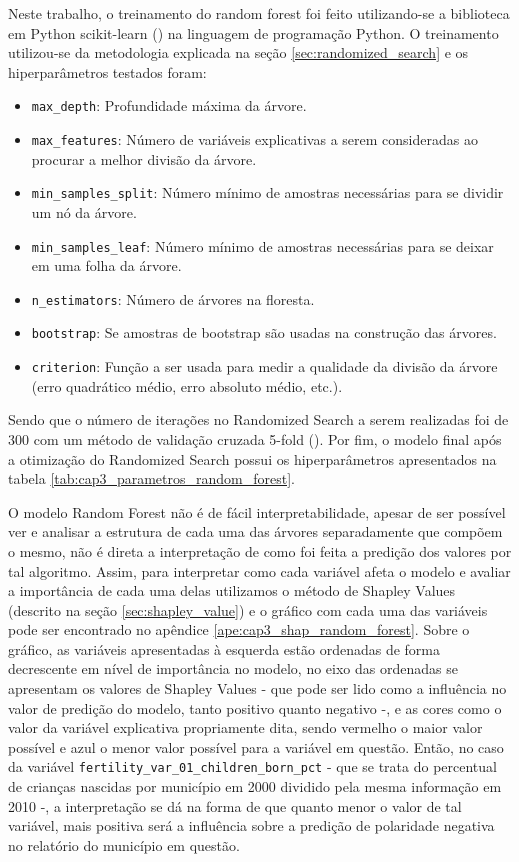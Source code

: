Neste trabalho, o treinamento do random forest foi feito utilizando-se a biblioteca em Python scikit-learn (\citet{Sklearn}) na linguagem de programação Python. O treinamento utilizou-se da metodologia explicada na seção \ref{sec:randomized_search} e os hiperparâmetros testados foram:

\begin{itemize}
	\item \verb|max_depth|: Profundidade máxima da árvore.
	\item \verb|max_features|: Número de variáveis explicativas a serem consideradas ao procurar a melhor divisão da árvore.
	\item \verb|min_samples_split|: Número mínimo de amostras necessárias para se dividir um nó da árvore.
	\item \verb|min_samples_leaf|: Número mínimo de amostras necessárias para se deixar em uma folha da árvore.
	\item \verb|n_estimators|: Número de árvores na floresta.
	\item \verb|bootstrap|: Se amostras de bootstrap são usadas na construção das árvores.
	\item \verb|criterion|: Função a ser usada para medir a qualidade da divisão da árvore (erro quadrático médio, erro absoluto médio, etc.).
\end{itemize}

Sendo que o número de iterações no Randomized Search a serem realizadas foi de 300 com um método de validação cruzada 5-fold (\citet{Kohavi1995}). Por fim, o modelo final após a otimização do Randomized Search possui os hiperparâmetros apresentados na tabela \ref{tab:cap3_parametros_random_forest}.

O modelo Random Forest não é de fácil interpretabilidade, apesar de ser possível ver e analisar a estrutura de cada uma das árvores separadamente que compõem o mesmo, não é direta a interpretação de como foi feita a predição dos valores por tal algoritmo. Assim, para interpretar como cada variável afeta o modelo e avaliar a importância de cada uma delas utilizamos o método de Shapley Values (descrito na seção \ref{sec:shapley_value}) e o gráfico com cada uma das variáveis pode ser encontrado no apêndice \ref{ape:cap3_shap_random_forest}. Sobre o gráfico, as variáveis apresentadas à esquerda estão ordenadas de forma decrescente em nível de importância no modelo, no eixo das ordenadas se apresentam os valores de Shapley Values - que pode ser lido como a influência no valor de predição do modelo, tanto positivo quanto negativo -, e as cores como o valor da variável explicativa propriamente dita, sendo vermelho o maior valor possível e azul o menor valor possível para a variável em questão. Então, no caso da variável \verb|fertility_var_01_children_born_pct| - que se trata do percentual de crianças nascidas por município em 2000 dividido pela mesma informação em 2010 -, a interpretação se dá na forma de que quanto menor o valor de tal variável, mais positiva será a influência sobre a predição de polaridade negativa no relatório do município em questão.

